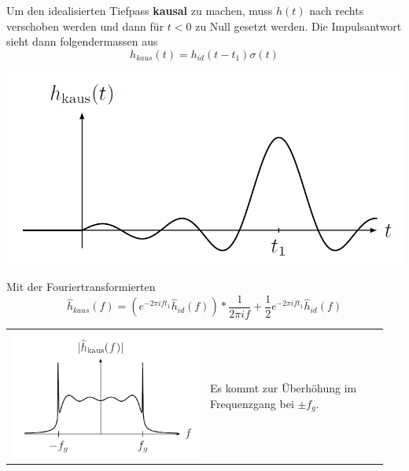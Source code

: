 Um den idealisierten Tiefpass \textbf{kausal} zu machen, muss $h(t)$ nach rechts verschoben werden und dann für $t < 0$ zu Null gesetzt werden. Die Impulsantwort sieht dann
folgendermassen aus
\begin{equation*}
    h_{kaus}(t)=h_{id}(t-t_1)\sigma(t)
\end{equation*}
\begin{center}
    \includegraphics[width=0.7\linewidth]{../img/7.3.1_TP_kaus_t.png}
\end{center}
Mit der Fouriertransformierten
\begin{equation*}
    \hat{h}_{kaus}(f) = (e^{-2\pi ift_1}\hat{h}_{id}(f))*\frac{1}{2\pi if}+\frac{1}{2}e^{-2\pi ift_1}\hat{h}_{id}(f)
\end{equation*}
\begin{tabular}[c]{@{}p{0.5\linewidth}p{0.45\linewidth}@{}}
    \begin{minipage}[top]{\linewidth}
        \includegraphics*[width=\linewidth]{../img/7.3.1_TP_kaus_f.png}
    \end{minipage}
     &
    \begin{minipage}[top]{\linewidth}
        Es kommt zur Überhöhung im Frequenzgang bei $\pm f_g$.
    \end{minipage}
\end{tabular}

